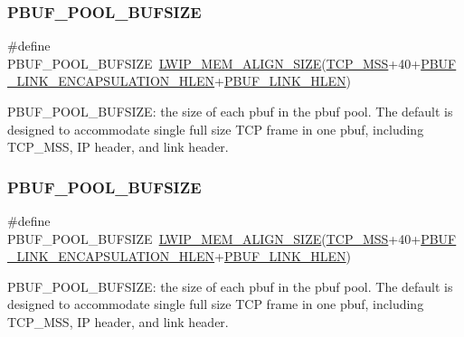 \subsubsection{\texorpdfstring{P\+B\+U\+F\+\_\+\+P\+O\+O\+L\+\_\+\+B\+U\+F\+S\+I\+ZE}{PBUF\_POOL\_BUFSIZE}\hspace{0.1cm}{\footnotesize\ttfamily [1/2]}}
{\footnotesize\ttfamily \#define P\+B\+U\+F\+\_\+\+P\+O\+O\+L\+\_\+\+B\+U\+F\+S\+I\+ZE~\hyperlink{group__compiler__abstraction_gaef204be511fd32f681b55abc08e9ae18}{L\+W\+I\+P\+\_\+\+M\+E\+M\+\_\+\+A\+L\+I\+G\+N\+\_\+\+S\+I\+ZE}(\hyperlink{group__lwip__opts__tcp_gaf1ab7bb27860aa3677c387a2f3ba317b}{T\+C\+P\+\_\+\+M\+SS}+40+\hyperlink{group__lwip__opts__pbuf_ga6e1ba1875ae5168a17b53d83597bc1de}{P\+B\+U\+F\+\_\+\+L\+I\+N\+K\+\_\+\+E\+N\+C\+A\+P\+S\+U\+L\+A\+T\+I\+O\+N\+\_\+\+H\+L\+EN}+\hyperlink{group__lwip__opts__pbuf_ga35998a3d56af9940e6a80bb372597685}{P\+B\+U\+F\+\_\+\+L\+I\+N\+K\+\_\+\+H\+L\+EN})}

P\+B\+U\+F\+\_\+\+P\+O\+O\+L\+\_\+\+B\+U\+F\+S\+I\+ZE\+: the size of each pbuf in the pbuf pool. The default is designed to accommodate single full size T\+CP frame in one pbuf, including T\+C\+P\+\_\+\+M\+SS, IP header, and link header. \mbox{\label{group__lwip__opts__pbuf_gae61f4491d56e805e79b79eb5d35a00e5}} 
\subsubsection{\texorpdfstring{P\+B\+U\+F\+\_\+\+P\+O\+O\+L\+\_\+\+B\+U\+F\+S\+I\+ZE}{PBUF\_POOL\_BUFSIZE}\hspace{0.1cm}{\footnotesize\ttfamily [2/2]}}
{\footnotesize\ttfamily \#define P\+B\+U\+F\+\_\+\+P\+O\+O\+L\+\_\+\+B\+U\+F\+S\+I\+ZE~\hyperlink{group__compiler__abstraction_gaef204be511fd32f681b55abc08e9ae18}{L\+W\+I\+P\+\_\+\+M\+E\+M\+\_\+\+A\+L\+I\+G\+N\+\_\+\+S\+I\+ZE}(\hyperlink{group__lwip__opts__tcp_gaf1ab7bb27860aa3677c387a2f3ba317b}{T\+C\+P\+\_\+\+M\+SS}+40+\hyperlink{group__lwip__opts__pbuf_ga6e1ba1875ae5168a17b53d83597bc1de}{P\+B\+U\+F\+\_\+\+L\+I\+N\+K\+\_\+\+E\+N\+C\+A\+P\+S\+U\+L\+A\+T\+I\+O\+N\+\_\+\+H\+L\+EN}+\hyperlink{group__lwip__opts__pbuf_ga35998a3d56af9940e6a80bb372597685}{P\+B\+U\+F\+\_\+\+L\+I\+N\+K\+\_\+\+H\+L\+EN})}

P\+B\+U\+F\+\_\+\+P\+O\+O\+L\+\_\+\+B\+U\+F\+S\+I\+ZE\+: the size of each pbuf in the pbuf pool. The default is designed to accommodate single full size T\+CP frame in one pbuf, including T\+C\+P\+\_\+\+M\+SS, IP header, and link header. 